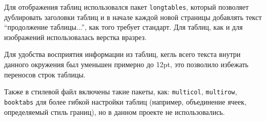 Для отображения таблиц использовался пакет \texttt{longtables}, который позволяет дублировать заголовки таблиц и в начале каждой новой страницы добавлять текст ``продолжение таблицы...'', как того требует стандарт. Для таблиц, как и для изображений использовалась верстка вразрез.

Для удобства восприятия информации из таблиц, кегль всего текста внутри данного окружения был уменьшен примерно до 12pt, это позволило избежать переносов строк таблицы.

Также в стилевой файл включены такие пакеты, как: \texttt{multicol}, \texttt{multirow}, \texttt{booktabs} для более гибкой настройки таблиц (например, объединение ячеек, определяемый стиль границ), но в данном проекте не использовались.